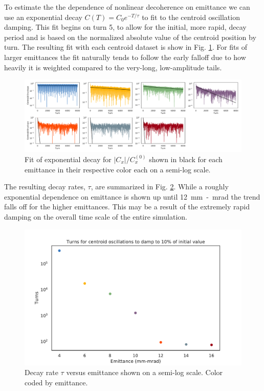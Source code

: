 \documentclass[aps,prstab,twocolumn, groupedaddress]{revtex4-1}
\begin{document}
To estimate the the dependence of nonlinear decoherence on emittance we can use an 
exponential decay $C(T) = C_0 e^{-T/\tau}$ to fit to the centroid oscillation damping. This 
fit begins on turn 5, to allow for the initial, more rapid, decay period and is based on the 
normalized absolute value of the centroid position by turn. The resulting fit with each 
centroid dataset is show in Fig. \ref{fig:decayfits}. For fits of larger emittances the fit 
naturally tends to follow the early falloff due to how heavily it is weighted compared to the 
very-long, low-amplitude tails.

\begin{figure}
	\includegraphics[width=\textwidth]{decay_rate_fits.pdf}%
	\caption{Fit of exponential decay  for $\left| C_x \right| / C_x^{(0)} $ shown in black for 
	each emittance in their respective color each on a semi-log scale. }
	\label{fig:decayfits} 
\end{figure}

The resulting decay rates, $\tau$, are summarized in Fig. \ref{fig:decayemit}. While a 
roughly exponential dependence on emittance is shown up until \SI{12}{mm-mrad} the 
trend falls off for the higher emittances. This may be a result of the extremely rapid 
damping on the overall time scale of the entire simulation.

\begin{figure}
	\includegraphics[width=\columnwidth]{decay_time.pdf}%
	\caption{Decay rate $\tau$ versus emittance shown on a semi-log scale. Color coded by 
	emittance.}
	\label{fig:decayemit} 
\end{figure}
\end{document}
